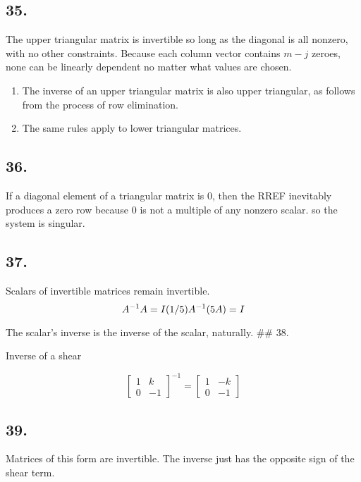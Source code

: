\documentclass[]{article}
\newcommand{\m}[1]{\begin{bmatrix}#1\end{bmatrix}}
\begin{document}
\hypertarget{section-76}{%
\subsection{35.}\label{section-76}}

The upper triangular matrix is invertible so long as the diagonal is all
nonzero, with no other constraints. Because each column vector contains
\(m-j\) zeroes, none can be linearly dependent no matter what values are
chosen.

\begin{enumerate}
\def\labelenumi{\alph{enumi}.}
\setcounter{enumi}{2}
\item
  The inverse of an upper triangular matrix is also upper triangular, as
  follows from the process of row elimination.
\item
  The same rules apply to lower triangular matrices.
\end{enumerate}

\hypertarget{section-77}{%
\subsection{36.}\label{section-77}}

If a diagonal element of a triangular matrix is 0, then the RREF
inevitably produces a zero row because 0 is not a multiple of any
nonzero scalar. so the system is singular.

\hypertarget{section-78}{%
\subsection{37.}\label{section-78}}

Scalars of invertible matrices remain invertible. \[A^{-1}A=I\\
(1/5)A^{-1}(5A)=I\\
\]

The scalar's inverse is the inverse of the scalar, naturally. \#\# 38.

Inverse of a shear

\[\m{1&k\\
0&-1}^{-1}=\m{
1&-k\\
0&-1}\]

\hypertarget{section-79}{%
\subsection{39.}\label{section-79}}

Matrices of this form are invertible. The inverse just has the opposite
sign of the shear term.
\end{document}
